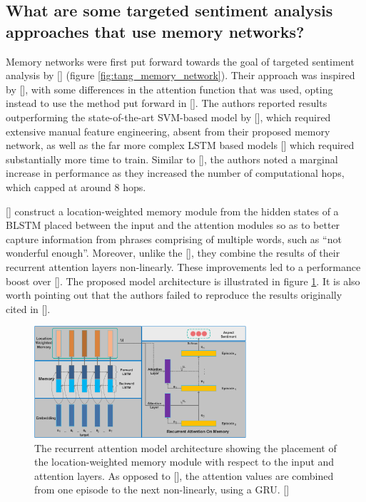 \documentclass[12pt, a4paper]{report}
\theoremstyle{definition}
\theoremstyle{definition}%
\theoremstyle{definition}%
\theoremstyle{definition}%
\theoremstyle{definition}%
\theoremstyle{definition}%
\renewcommand{\cite}[1]{[\citealp{#1}]}
\begin{document}
\subsection{What are some targeted sentiment analysis approaches that use memory networks?}
Memory networks were first put forward towards the goal of targeted sentiment analysis by \cite{tang2016} (figure \ref{fig:tang_memory_network}). Their approach was inspired by \cite{sukhbaatar2015}, with some differences in the attention function that was used, opting instead to use the method put forward in \cite{bahdanau2014}. The authors reported results outperforming the state-of-the-art SVM-based model by \cite{kiritchenko}, which required extensive manual feature engineering, absent from their proposed memory network, as well as the far more complex LSTM based models \cite{tang2016} which required substantially more time to train. Similar to \cite{sukhbaatar2015}, the authors noted a marginal increase in performance as they increased the number of computational hops, which capped at around 8 hops. 

\cite{chen2017} construct a location-weighted memory module from the hidden states of a BLSTM placed between the input and the attention modules so as to better capture information from phrases comprising of multiple words, such as \enquote{not wonderful enough}. Moreover, unlike the \cite{tang2016}, they combine the results of their recurrent attention layers non-linearly. These improvements led to a performance boost over \cite{tang2016}. The proposed model architecture is illustrated in figure \ref{fig:chen_recurrent_attention_model}. It is also worth pointing out that the authors failed to reproduce the results originally cited in \cite{tang2016}. 

\begin{figure}[!ht]
    \centering
    \includegraphics[width=0.7\textwidth]{fyp_template/figures/chen_recurrent_attention.png}
    \caption{The recurrent attention model architecture showing the placement of the location-weighted memory module with respect to the input and attention layers. As opposed to \cite{tang2016}, the attention values are combined from one episode to the next non-linearly, using a GRU. \cite{chen2017}}
    \label{fig:chen_recurrent_attention_model}
\end{figure}
\end{document}
